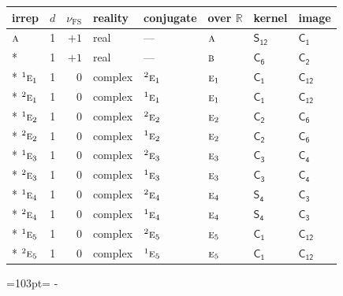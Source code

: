 \documentclass[10pt,a4paper]{article}
\newcommand{\needspace}[1]{\par\penalty-100\begingroup\dimen0=#1\relax\dimen2=\pagegoal
  \advance\dimen2-\pagetotal\ifdim\dimen0>\dimen2\relax\ifdim\dimen2>0pt\vfil\break\fi\fi
  \endgroup}
\numberwithin{equation}{section}
\newcommand{\grp}[1]{\mathsf{#1}}
\newcommand{\irr}[1]{\text{\normalfont\scshape #1}}
\newcommand{\conjpair}[1]{{}^{#1}}
\newcommand{\detbox}[1]{{\setlength{\fboxsep}{1pt}\fbox{#1}}}
\newcommand{\fsind}{\nu_{\mathrm{FS}}}
\begin{document}
{\small\renewcommand{\arraystretch}{1.25}\setlength{\tabcolsep}{4pt}\begin{longtable}{@{}lrrlllll@{}}\toprule
irrep & $d$ & $\fsind$ & reality & conjugate & over $\mathbb{R}$ & kernel & image\\\midrule\endhead
\bottomrule\endfoot\endlastfoot
$\irr{a}$ & 1 & $+1$ & real & --- & $\irr{a}$ & \href{S12.pdf}{$\grp{S_{12}}$} & \href{C1.pdf}{$\grp{C_{1}}$}\\*
\detbox{$\irr{b}$} & 1 & $+1$ & real & --- & $\irr{b}$ & \href{C6.pdf}{$\grp{C_{6}}$} & \href{C2.pdf}{$\grp{C_{2}}$}\\*
$\conjpair{1}\irr{e}_{1}$ & 1 & $0$ & complex & $\conjpair{2}\irr{e}_{1}$ & $\irr{e}_{1}$ & \href{C1.pdf}{$\grp{C_{1}}$} & \href{C12.pdf}{$\grp{C_{12}}$}\\*
$\conjpair{2}\irr{e}_{1}$ & 1 & $0$ & complex & $\conjpair{1}\irr{e}_{1}$ & $\irr{e}_{1}$ & \href{C1.pdf}{$\grp{C_{1}}$} & \href{C12.pdf}{$\grp{C_{12}}$}\\*
$\conjpair{1}\irr{e}_{2}$ & 1 & $0$ & complex & $\conjpair{2}\irr{e}_{2}$ & $\irr{e}_{2}$ & \href{C2.pdf}{$\grp{C_{2}}$} & \href{C6.pdf}{$\grp{C_{6}}$}\\*
$\conjpair{2}\irr{e}_{2}$ & 1 & $0$ & complex & $\conjpair{1}\irr{e}_{2}$ & $\irr{e}_{2}$ & \href{C2.pdf}{$\grp{C_{2}}$} & \href{C6.pdf}{$\grp{C_{6}}$}\\*
$\conjpair{1}\irr{e}_{3}$ & 1 & $0$ & complex & $\conjpair{2}\irr{e}_{3}$ & $\irr{e}_{3}$ & \href{C3.pdf}{$\grp{C_{3}}$} & \href{C4.pdf}{$\grp{C_{4}}$}\\*
$\conjpair{2}\irr{e}_{3}$ & 1 & $0$ & complex & $\conjpair{1}\irr{e}_{3}$ & $\irr{e}_{3}$ & \href{C3.pdf}{$\grp{C_{3}}$} & \href{C4.pdf}{$\grp{C_{4}}$}\\*
$\conjpair{1}\irr{e}_{4}$ & 1 & $0$ & complex & $\conjpair{2}\irr{e}_{4}$ & $\irr{e}_{4}$ & \href{S4.pdf}{$\grp{S_{4}}$} & \href{C3.pdf}{$\grp{C_{3}}$}\\*
$\conjpair{2}\irr{e}_{4}$ & 1 & $0$ & complex & $\conjpair{1}\irr{e}_{4}$ & $\irr{e}_{4}$ & \href{S4.pdf}{$\grp{S_{4}}$} & \href{C3.pdf}{$\grp{C_{3}}$}\\*
$\conjpair{1}\irr{e}_{5}$ & 1 & $0$ & complex & $\conjpair{2}\irr{e}_{5}$ & $\irr{e}_{5}$ & \href{C1.pdf}{$\grp{C_{1}}$} & \href{C12.pdf}{$\grp{C_{12}}$}\\*
$\conjpair{2}\irr{e}_{5}$ & 1 & $0$ & complex & $\conjpair{1}\irr{e}_{5}$ & $\irr{e}_{5}$ & \href{C1.pdf}{$\grp{C_{1}}$} & \href{C12.pdf}{$\grp{C_{12}}$}\\
\bottomrule\end{longtable}}
\needspace{103pt}
\end{document}
